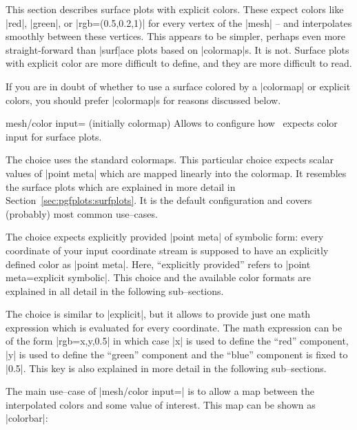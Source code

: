 {{This section describes surface plots with explicit colors. These expect colors like |red|, |green|, or |rgb=(0.5,0.2,1)| for every vertex of the |mesh| -- and interpolates smoothly between these vertices. This appears to be simpler, perhaps even more straight-forward than |surf|ace plots based on |colormap|s. It is not. Surface plots with explicit color are more difficult to define, and they are more difficult to read.

If you are in doubt of whether to use a surface colored by a |colormap| or explicit colors, you should prefer |colormap|s for reasons discussed below.

\begin{pgfplotskey}{mesh/color input= (initially colormap)}
Allows to configure how \PGFPlots\ expects color input for surface plots.

The choice  uses the standard colormaps. This particular choice expects scalar values of |point meta| which are mapped linearly into the colormap. It resembles the surface plots which are explained in more detail in Section~\ref{sec:pgfplots:surfplots}. It is the default configuration and covers (probably) most common use--cases.

The choice  expects explicitly provided |point meta| of symbolic form: every coordinate of your input coordinate stream is supposed to have an explicitly defined color as |point meta|. Here, ``explicitly provided'' refers to |point meta=explicit symbolic|. This choice and the available color formats are explained in all detail in the following sub--sections.%

The choice  is similar to |explicit|, but it allows to provide just one math expression which is evaluated for every coordinate. The math expression can be of the form |rgb=x,y,0.5| in which case |x| is used to define the ``red'' component, |y| is used to define the ``green'' component and the ``blue'' component is fixed to |0.5|. This key is also explained in more detail in the following sub--sections.%


The main use--case of |mesh/color input=| is to allow a map between the interpolated colors and some value of interest. This map can be shown as |colorbar|:
\begin{codeexample}[]
\end{codeexample}
\end{pgfplotskey}}}
